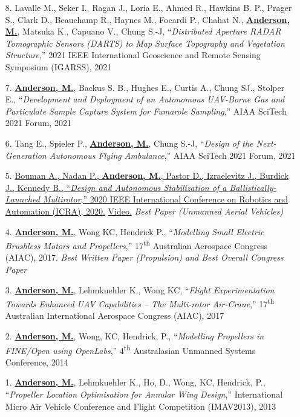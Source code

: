 \documentclass[12pt,letter,sans]{moderncv}
\begin{document}
\begin{itemize}
    \item [8.] Lavalle M., Seker I., Ragan J., Loria E., Ahmed R., Hawkins B. P., Prager S., Clark D., Beauchamp R., Haynes M., Focardi P., Chahat N., \underline{\textbf{Anderson, M.}}, Matsuka K., Capuano V., Chung S.-J, ``\textit{Distributed Aperture RADAR Tomographic Sensors (DARTS) to Map Surface Topography and Vegetation Structure},'' 2021 IEEE International Geoscience and Remote Sensing Symposium (IGARSS), 2021
    
    \item [7.] \underline{\textbf{Anderson, M.}}, Backus S. B., Hughes E., Curtis A., Chung SJ., Stolper E., ``\textit{Development and Deployment of an Autonomous UAV-Borne Gas and Particulate Sample Capture System for Fumarole Sampling},'' AIAA SciTech 2021 Forum, 2021

    \item [6.] Tang E., Spieler P., \underline{\textbf{Anderson, M.}}, Chung S.-J, ``\textit{Design of the Next-Generation Autonomous Flying Ambulance},'' AIAA SciTech 2021 Forum, 2021
    
    \item [5.] \href{https://arxiv.org/pdf/1911.10269}
    {Bouman A., Nadan P., \underline{\textbf{Anderson, M.}}, Pastor D., Izraelevitz J., Burdick J., Kennedy B., ``\textit{Design and Autonomous Stabilization of a Ballistically-Launched Multirotor},'' 2020 IEEE International Conference on Robotics and Automation (ICRA), 2020.}
    \href{https://www.youtube.com/watch?v=VVgcsRmd8F0}{Video.}
    \textit{Best Paper (Unmanned Aerial Vehicles)}
    
    \item [4.] \underline{\textbf{Anderson, M.}}, Wong KC, Hendrick P., ``\textit{Modelling Small Electric Brushless Motors and Propellers},'' 17\textsuperscript{th} Australian Aerospace Congress (AIAC), 2017. \textit{Best Written Paper (Propulsion) and Best Overall Congress Paper}
    
    \item [3.] \underline{\textbf{Anderson, M.}}, Lehmkuehler K., Wong KC, ``\textit{Flight Experimentation Towards Enhanced UAV Capabilities -- The Multi-rotor Air-Crane},'' 17\textsuperscript{th} Australian International Aerospace Congress (AIAC), 2017
    
    \item [2.] \underline{\textbf{Anderson, M.}}, Wong, KC, Hendrick, P., ``\textit{Modelling Propellers in FINE/Open using OpenLabs},'' 4\textsuperscript{th} Australasian Unmanned Systems Conference, 2014
    
    \item [1.] \underline{\textbf{Anderson, M.}}, Lehmkuehler K., Ho, D., Wong, KC, Hendrick, P., ``\textit{Propeller Location Optimisation for Annular Wing Design},'' International Micro Air Vehicle Conference and Flight Competition (IMAV2013), 2013
    
\end{itemize}
\end{document}
